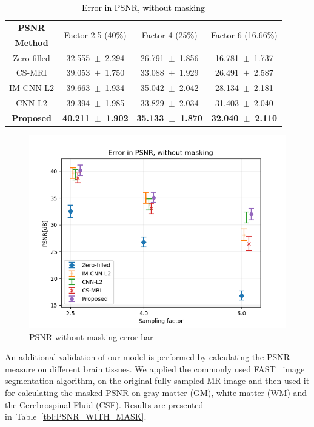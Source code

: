 \documentclass[review]{elsarticle}
\begin{document}
\begin{table}[H]
	\centering{}
	\begin{tabular}{|c||c||c||c|}
		\hline 
		\textbf{PSNR} & \multicolumn{1}{c||}{\multirow{2}{*}{Factor 2.5 (40\%)}} & \multicolumn{1}{c||}{\multirow{2}{*}{Factor 4 (25\%)}} & \multicolumn{1}{c|}{\multirow{2}{*}{Factor 6 (16.66\%)}} \tabularnewline
		\textbf{Method} & \multicolumn{1}{c||}{} & \multicolumn{1}{c||}{} & \multicolumn{1}{c|}{} \tabularnewline \cline{1-4}
		
		Zero-filled         &32.555~$\pm$~2.294  &26.791~$\pm$~1.856 &16.781~$\pm$~1.737\tabularnewline
		CS-MRI              &39.053~$\pm$~1.750  &33.088~$\pm$~1.929 &26.491~$\pm$~2.587\tabularnewline
		IM-CNN-L2           &39.663~$\pm$~1.934  &35.042~$\pm$~2.042 &28.134~$\pm$~2.181\tabularnewline
		CNN-L2              &39.394~$\pm$~1.985  &33.829~$\pm$~2.034 &31.403~$\pm$~2.040\tabularnewline
		\textbf{Proposed}   &\textbf{40.211~$\pm$~1.902}  &\textbf{35.133~$\pm$~1.870}   &\textbf{32.040~$\pm$~2.110}\tabularnewline
		\hline 
	\end{tabular}\caption{\textcolor{black}{\footnotesize{}{}Error in PSNR, without masking}{\footnotesize{}\label{tbl:PSNR_NO_MASK}}}
\end{table}



\begin{figure}[H]
\centering
\includegraphics[width=0.7\linewidth]{include/grp2/error_psnr_errorbar}
\caption{PSNR without masking error-bar}
\end{figure}\label{fig:error_psnr_errorbar}

An additional validation of our model is performed by calculating the PSNR measure on different brain tissues. We applied the commonly used FAST~\cite{zhang2001segmentation} image segmentation algorithm, on the original fully-sampled MR image and then used it for calculating the masked-PSNR on gray matter (GM), white matter (WM) and the Cerebrospinal Fluid (CSF). Results are presented in~Table~\ref{tbl:PSNR_WITH_MASK}.
\end{document}
